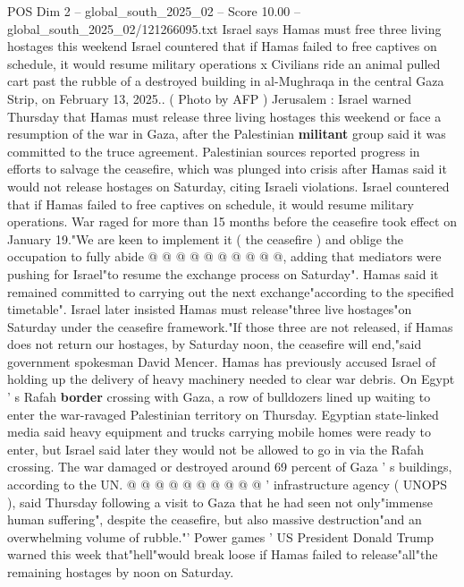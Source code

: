 \begin{textsample}{POS Dim 2 – global\_south\_2025\_02 – Score 10.00 – global\_south\_2025\_02/121266095.txt}  \label{ex:f2_pos_379}
Israel says Hamas must free three living hostages this weekend Israel countered that if Hamas failed to free captives on schedule, it would resume military operations x Civilians ride an animal pulled cart past the rubble of a destroyed building in al-Mughraqa in the central Gaza Strip, on February 13, 2025.. ( Photo by AFP ) Jerusalem : Israel warned Thursday that Hamas must release three living hostages this weekend or face a resumption of the war in Gaza, after the Palestinian \textbf{militant} group said it was committed to the truce agreement.
Palestinian sources reported progress in efforts to salvage the ceasefire, which was plunged into crisis after Hamas said it would not release hostages on Saturday, citing Israeli violations.
Israel countered that if Hamas failed to free captives on schedule, it would resume military operations.
War raged for more than 15 months before the ceasefire took effect on January 19."We are keen to implement it ( the ceasefire ) and oblige the occupation to fully abide @ @ @ @ @ @ @ @ @ @, adding that mediators were pushing for Israel"to resume the exchange process on Saturday".
Hamas said it remained committed to carrying out the next exchange"according to the specified timetable".
Israel later insisted Hamas must release"three live hostages"on Saturday under the ceasefire framework."If those three are not released, if Hamas does not return our hostages, by Saturday noon, the ceasefire will end,"said government spokesman David Mencer.
Hamas has previously accused Israel of holding up the delivery of heavy machinery needed to clear war debris.
On Egypt ' s Rafah \textbf{border} crossing with Gaza, a row of bulldozers lined up waiting to enter the war-ravaged Palestinian territory on Thursday.
Egyptian state-linked media said heavy equipment and trucks carrying mobile homes were ready to enter, but Israel said later they would not be allowed to go in via the Rafah crossing.
The war damaged or destroyed around 69 percent of Gaza ' s buildings, according to the UN. @ @ @ @ @ @ @ @ @ @ ' infrastructure agency ( UNOPS ), said Thursday following a visit to Gaza that he had seen not only"immense human suffering", despite the ceasefire, but also massive destruction"and an overwhelming volume of rubble."' Power games ' US President Donald Trump warned this week that"hell"would break loose if Hamas failed to release"all"the remaining hostages by noon on Saturday.

\end{textsample}
